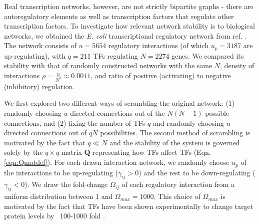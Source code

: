 \documentclass[10pt]{article}
\begin{document}
Real transcription networks, however, are not strictly bipartite graphs - there are autoregulatory elements as well as transcription factors that regulate other transcription factors. To investigate how relevant network stability is to biological networks, we obtained the \textit{E. coli} transcriptional regulatory network from ref. \cite{fang2017global}. The network consists of $u = 5654$ regulatory interactions (of which $u_p = 3187$ are up-regulating), with $q = 211$ TFs regulating $N = 2274$ genes. We compared its stability with that of randomly constructed networks with the same $N$, density of interactions $\rho = \frac{u}{N^2} \approx 0.0011$, and ratio of positive (activating) to negative (inhibitory) regulation. 

We first explored two different ways of scrambling the original network: (1) randomly choosing $u$ directed connections out of the $N(N-1)$ possible connections, and (2) fixing the number of TFs $q$ and randomly choosing $u$ directed connections out of $qN$ possibilities. The second method of scrambling is motivated by the fact that $q \ll N$ and the stability of the system is governed solely by the $q \times q$ matrix $\mathbf{Q}$ representing how TFs affect TFs (Eqn.\ref{eqn:Qmatdef}). For each drawn interaction network, we randomly choose $u_p$ of the interactions to be up-regulating ($\gamma_{ij}>0$) and the rest to be down-regulating ($\gamma_{ij}<0$). We draw the fold-change $\Omega_{ij}$ of each regulatory interaction from a uniform distribution between 1 and $\Omega_{max}=1000$. This choice of $\Omega_{max}$ is motivated by the fact that TFs have been shown experimentally to change target protein levels by ~100-1000 fold \cite{kuhlman2007combinatorial}.
\end{document}
